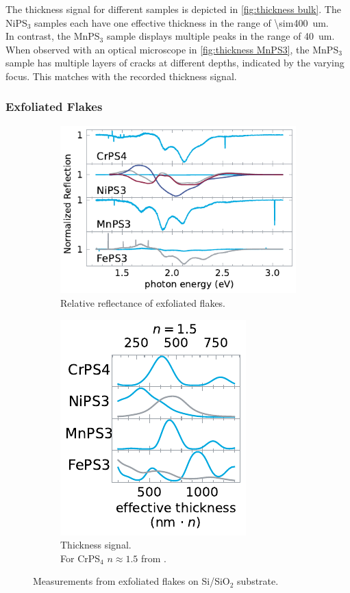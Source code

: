 \documentclass[
	oneside,
	parskip=half,
	a4paper,
]{scrbook}
\begin{document}
The thickness signal for  different samples is depicted in \autoref{fig:thickness bulk}.
The NiPS$_3$ samples each have one effective thickness in the range of \SI{\sim400}{um}.\\
In contrast, the MnPS$_3$ sample displays multiple peaks in the range of \SI{40}{um}.
When observed with an optical microscope in \autoref{fig:thickness MnPS3}, the MnPS$_3$ sample has multiple layers of cracks at different depths, indicated by the varying focus.
This matches with the recorded thickness signal.

\subsubsection*{Exfoliated Flakes}
\begin{figure}
	\centering
	\begin{subfigure}[c]{3.5in}
		\centering
		\includegraphics{../figures/2024-04-10 normalized reflection spectra.pdf}
		\caption{Relative reflectance of exfoliated flakes.}
		\label{fig:reflection flakes}
	\end{subfigure}
	\begin{subfigure}[c]{2in}
		\centering
		\includegraphics{../figures/2024-03-14 thickness flakes.pdf}
		\caption{Thickness signal.\\ For CrPS$_4$  $n\approx1.5$ from \cite{CrPS4_refrative}. }
		\label{fig:thickness flakes}
	\end{subfigure}
	\caption{Measurements from exfoliated flakes on Si/SiO$_2$ substrate.}
\end{figure}
\end{document}
